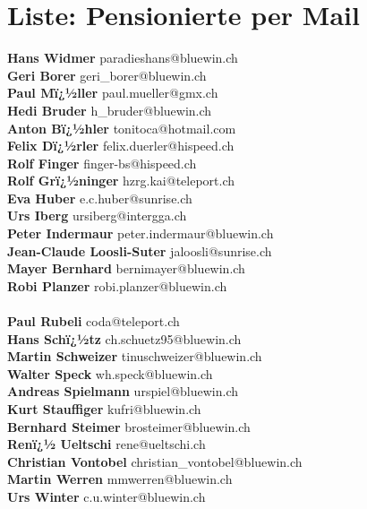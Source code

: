 \documentclass{scrartcl}
\begin{document}
\section*{Liste: Pensionierte per Mail}
\textbf{Hans Widmer } paradieshans@bluewin.ch\\
\textbf{Geri Borer } geri_borer@bluewin.ch\\
\textbf{Paul Mï¿½ller                     \n	 } paul.mueller@gmx.ch\\
\textbf{Hedi Bruder } h_bruder@bluewin.ch\\
\textbf{Anton Bï¿½hler                     \n	 } tonitoca@hotmail.com\\
\textbf{Felix Dï¿½rler                     \n	 } felix.duerler@hispeed.ch\\
\textbf{Rolf Finger } finger-bs@hispeed.ch\\
\textbf{Rolf Grï¿½ninger                     \n	 } hzrg.kai@teleport.ch\\
\textbf{Eva Huber } e.c.huber@sunrise.ch\\
\textbf{Urs Iberg } ursiberg@intergga.ch\\
\textbf{Peter Indermaur } peter.indermaur@bluewin.ch\\
\textbf{Jean-Claude Loosli-Suter } jaloosli@sunrise.ch\\
\textbf{Mayer Bernhard } bernimayer@bluewin.ch\\
\textbf{Robi Planzer } robi.planzer@bluewin.ch\\
\textbf{} \\
\textbf{Paul Rubeli } coda@teleport.ch\\
\textbf{Hans Schï¿½tz                     \n	 } ch.schuetz95@bluewin.ch\\
\textbf{Martin Schweizer } tinuschweizer@bluewin.ch\\
\textbf{Walter Speck } wh.speck@bluewin.ch\\
\textbf{Andreas Spielmann } urspiel@bluewin.ch\\
\textbf{Kurt Stauffiger } kufri@bluewin.ch\\
\textbf{Bernhard Steimer } brosteimer@bluewin.ch\\
\textbf{Renï¿½ Ueltschi                     \n	 } rene@ueltschi.ch\\
\textbf{Christian Vontobel } christian_vontobel@bluewin.ch\\
\textbf{Martin Werren } mmwerren@bluewin.ch\\
\textbf{Urs Winter } c.u.winter@bluewin.ch\\
\end{document}

